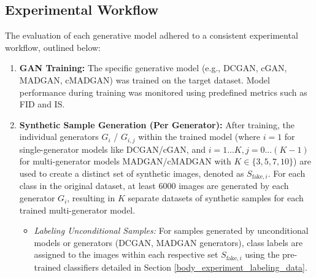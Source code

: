 \subsection{Experimental Workflow}\label{body_experiment_succession}

The evaluation of each generative model adhered to a consistent experimental workflow, outlined below:

\begin{enumerate}
    \item \textbf{GAN Training:} The specific generative model (e.g., DCGAN, cGAN, MADGAN, cMADGAN) was trained on the target dataset. Model performance during training was monitored using predefined metrics such as FID and IS.

    \item \textbf{Synthetic Sample Generation (Per Generator):} After training, the individual generators \(G_i\) / \(G_{i, j}\) within the trained model (where \(i=1\) for single-generator models like DCGAN/cGAN, and \(i=1...K, j=0...(K-1)\) for multi-generator models MADGAN/cMADGAN with \(K \in \{3, 5, 7, 10\}\)) are used to create a distinct set of synthetic images, denoted as \(S_{\text{fake}, i}\). For each class in the original dataset, at least $6 000$ images are generated by each generator \(G_i\), resulting in \(K\) separate datasets of synthetic samples for each trained multi-generator model.
        \begin{itemize}
            \item \textit{Labeling Unconditional Samples:} For samples generated by unconditional models or generators (DCGAN, MADGAN generators), class labels are assigned to the images within each respective set \(S_{\text{fake}, i}\) using the pre-trained classifiers detailed in Section \ref{body_experiment_labeling_data}.
        \end{itemize}


\end{enumerate}
